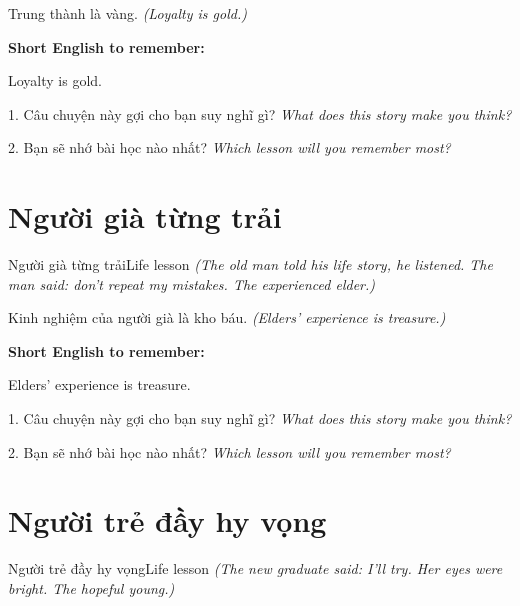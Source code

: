 \begin{baihoc}
Trung thành là vàng.
\textit{(Loyalty is gold.)}
\end{baihoc}

\begin{ghinhoanh}
\textbf{Short English to remember:}

Loyalty is gold.

\end{ghinhoanh}

\begin{tuhocnhanh}
1. Câu chuyện này gợi cho bạn suy nghĩ gì? \textit{What does this story make you think?}

2. Bạn sẽ nhớ bài học nào nhất? \textit{Which lesson will you remember most?}
\end{tuhocnhanh}
\ngancach


\section{Người già từng trải}
\begin{truyen}{Người già từng trải}{Life lesson}
\textit{(The old man told his life story, he listened. The man said: don't repeat my mistakes. The experienced elder.)}
\end{truyen}

\begin{baihoc}
Kinh nghiệm của người già là kho báu.
\textit{(Elders' experience is treasure.)}
\end{baihoc}

\begin{ghinhoanh}
\textbf{Short English to remember:}

Elders' experience is treasure.

\end{ghinhoanh}

\begin{tuhocnhanh}
1. Câu chuyện này gợi cho bạn suy nghĩ gì? \textit{What does this story make you think?}

2. Bạn sẽ nhớ bài học nào nhất? \textit{Which lesson will you remember most?}
\end{tuhocnhanh}
\ngancach


\section{Người trẻ đầy hy vọng}
\begin{truyen}{Người trẻ đầy hy vọng}{Life lesson}
\textit{(The new graduate said: I'll try. Her eyes were bright. The hopeful young.)}
\end{truyen}


